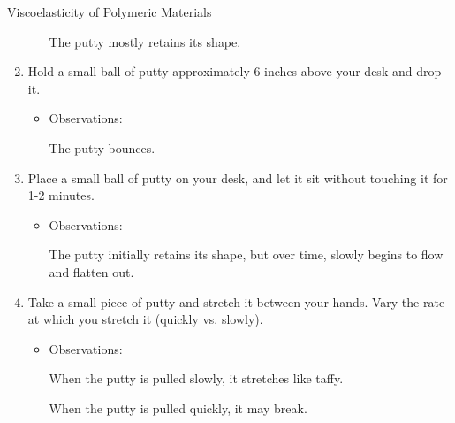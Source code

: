 \begin{activity}{Viscoelasticity of Polymeric Materials}
\begin{model}
\begin{enumerate}
\begin{itemize}
				\begin{solution}[1in]
				
					The putty mostly retains its shape.
					
				\end{solution}
			\end{itemize}
			
		\item Hold a small ball of putty approximately 6 inches above your desk and drop it.
			\begin{itemize}
				\item Observations:
				
				\begin{solution}[1in]
				
					The putty bounces.
					
				\end{solution}
			\end{itemize}
		
		\item Place a small ball of putty on your desk, and let it sit without touching it for 1-2 minutes.
			\begin{itemize}
				\item Observations:
				
				\begin{solution}[1in]
				
					The putty initially retains its shape, but over time, slowly begins to flow and flatten out.
					
				\end{solution}
			\end{itemize}
		
		\item Take a small piece of putty and stretch it between your hands.  Vary the rate at which you stretch it (quickly vs. slowly).
			\begin{itemize}
				\item Observations:
				
				\begin{solution}[1.25in]
				
					When the putty is pulled slowly, it stretches like taffy.
					
					When the putty is pulled quickly, it may break.
					
				\end{solution}
			\end{itemize}
		
	\end{enumerate}


\end{model}
\end{activity}
